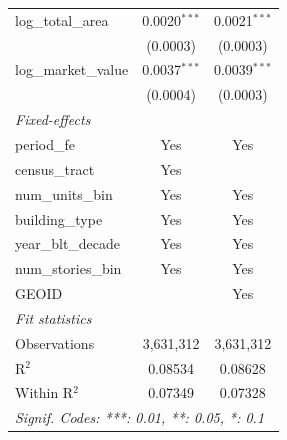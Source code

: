 \begin{tabular}{lcc}
   log\_total\_area                                      & 0.0020$^{***}$          & 0.0021$^{***}$\\   
                                                         & (0.0003)                & (0.0003)\\   
   log\_market\_value                                    & 0.0037$^{***}$          & 0.0039$^{***}$\\   
                                                         & (0.0004)                & (0.0003)\\   
   \midrule
   \emph{Fixed-effects}\\
   period\_fe                                            & Yes                     & Yes\\  
   census\_tract                                         & Yes                     & \\  
   num\_units\_bin                                       & Yes                     & Yes\\  
   building\_type                                        & Yes                     & Yes\\  
   year\_blt\_decade                                     & Yes                     & Yes\\  
   num\_stories\_bin                                     & Yes                     & Yes\\  
   GEOID                                                 &                         & Yes\\  
   \midrule
   \emph{Fit statistics}\\
   Observations                                          & 3,631,312               & 3,631,312\\  
   R$^2$                                                 & 0.08534                 & 0.08628\\  
   Within R$^2$                                          & 0.07349                 & 0.07328\\  
   \midrule \midrule
   \multicolumn{3}{l}{\emph{Signif. Codes: ***: 0.01, **: 0.05, *: 0.1}}\\
\end{tabular}
\par\endgroup
\begingroup
\centering
